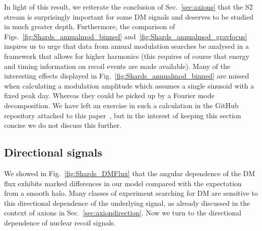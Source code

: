 \documentclass[prd,10pt,twocolumn,showpacs,nofootinbib,aps,superscriptaddress,preprintnumbers]{revtex4-1}
\begin{document}
  
  In light of this result, we reiterate the conclusion of
  Sec.~\ref{sec:axions} that the S2 stream is surprisingly important for
  some DM signals and deserves to be studied in much greater
  depth. Furthermore, the comparison of
  Figs.~\ref{fig:Shards_annualmod_binned}
  and~\ref{fig:Shards_annualmod_gravfocus} inspires us to urge that data
  from annual modulation searches be analysed in a framework that allows
  for higher harmonics (this requires of course that energy and timing
  information on recoil events are made available). Many of the
  interesting effects displayed in
  Fig.~\ref{fig:Shards_annualmod_binned} are missed when calculating a
  modulation amplitude which assumes a single sinusoid with a fixed peak
  day. Whereas they could be picked up by a Fourier mode
  decomposition. We have left an exercise in such a calculation in the
  GitHub repository attached to this
  paper~\cite{DarkShards}, but in
  the interest of keeping this section concise we do not discuss this
  further.


  \subsection{Directional signals}\label{sec:directional}

  We showed in Fig.~\ref{fig:Shards_DMFlux} that the angular dependence
  of the DM flux exhibits marked differences in our model compared with
  the expectation from a smooth halo. Many classes of experiment
  searching for DM are sensitive to this directional dependence of the
  underlying signal, as already discussed in the context of axions in
  Sec.~\ref{sec:axiondirection}. Now we turn to the directional
  dependence of nuclear recoil signals.
  
\end{document}
